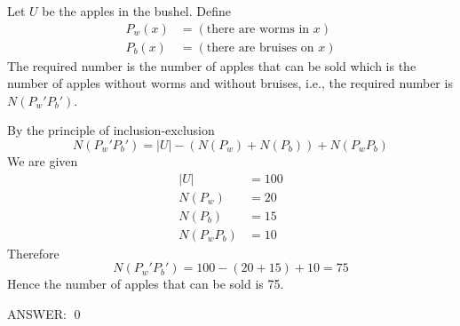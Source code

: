 Let $U$ be the apples in the bushel.
Define
\begin{align*}
P_w(x) &= (\text{there are worms in $x$}) \\
P_b(x) &= (\text{there are bruises on $x$})
\end{align*}
The required number is the number of apples that can be sold
which is the number of apples without worms and without bruises, 
i.e., the required number is $N(P_w' P_b')$.

By the principle of inclusion-exclusion
\[
N(P_w' P_b') = |U| - (N(P_w) + N(P_b)) + N(P_wP_b)
\]
We are given 
\begin{align*}
|U| &= 100 \\
N(P_w) &= 20 \\
N(P_b) &= 15 \\
N(P_w P_b) &= 10
\end{align*}
Therefore
\[
N(P_w' P_b') = 100 - (20 + 15) + 10 = 75
\]
Hence the number of apples that can be sold is 75.

ANSWER:
\qed



